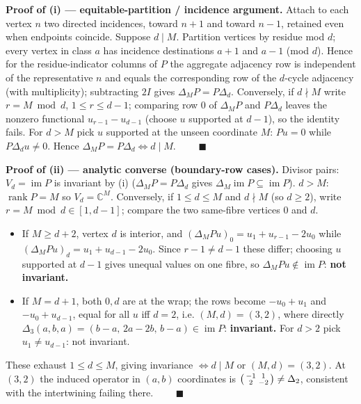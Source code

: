 \documentclass[
  11pt,
  a4paper,
]{article}
\providecommand{\tightlist}{%
  \setlength{\itemsep}{0pt}\setlength{\parskip}{0pt}}
\begin{document}
\textbf{Proof of (i) --- equitable-partition / incidence argument.} Attach to each vertex \(n\) two directed incidences, toward \(n{+}1\) and toward \(n{-}1\), retained even when endpoints coincide. Suppose \(d\mid M\). Partition vertices by residue mod \(d\); every vertex in class \(a\) has incidence destinations \(a{+}1\) and \(a{-}1\) (mod \(d\)). Hence for the residue-indicator columns of \(P\) the aggregate adjacency row is independent of the representative \(n\) and equals the corresponding row of the \(d\)-cycle adjacency (with multiplicity); subtracting \(2I\) gives \(\Delta_M P=P\Delta_d\). Conversely, if \(d\nmid M\) write \(r=M\bmod d\), \(1\le r\le d-1\); comparing row \(0\) of \(\Delta_M P\) and \(P\Delta_d\) leaves the nonzero functional \(u_{r-1}-u_{d-1}\) (choose \(u\) supported at \(d-1\)), so the identity fails. For \(d>M\) pick \(u\) supported at the unseen coordinate \(M\): \(Pu=0\) while \(P\Delta_d u\neq0\). Hence \(\Delta_M P=P\Delta_d\iff d\mid M\). \(\qquad\blacksquare\)

\textbf{Proof of (ii) --- analytic converse (boundary-row cases).} Divisor pairs: \(V_d=\operatorname{im}P\) is invariant by (i) (\(\Delta_M P=P\Delta_d\) gives \(\Delta_M\operatorname{im}P\subseteq\operatorname{im}P\)). \(d>M\): \(\operatorname{rank}P=M\) so \(V_d=\mathbb C^M\). Conversely, if \(1\le d\le M\) and \(d\nmid M\) (so \(d\ge2\)), write \(r=M\bmod d\in[1,d-1]\); compare the two same-fibre vertices \(0\) and \(d\).

\begin{itemize}
\tightlist
\item
  If \(M\ge d+2\), vertex \(d\) is interior, and \((\Delta_M Pu)_0=u_1+u_{r-1}-2u_0\) while \((\Delta_M Pu)_d=u_1+u_{d-1}-2u_0\). Since \(r-1\neq d-1\) these differ; choosing \(u\) supported at \(d-1\) gives unequal values on one fibre, so \(\Delta_M Pu\notin\operatorname{im}P\): \textbf{not invariant.}
\item
  If \(M=d+1\), both \(0,d\) are at the wrap; the rows become \(-u_0+u_1\) and \(-u_0+u_{d-1}\), equal for all \(u\) iff \(d=2\), i.e. \((M,d)=(3,2)\), where directly \(\Delta_3(a,b,a)=(b{-}a,\,2a{-}2b,\,b{-}a)\in\operatorname{im}P\): \textbf{invariant.} For \(d>2\) pick \(u_1\neq u_{d-1}\): not invariant.
\end{itemize}

These exhaust \(1\le d\le M\), giving invariance \(\iff d\mid M\) or \((M,d)=(3,2)\). At \((3,2)\) the induced operator in \((a,b)\) coordinates is \(\begin{psmallmatrix}-1&1\\2&-2\end{psmallmatrix}\neq\Delta_2\), consistent with the intertwining failing there. \(\qquad\blacksquare\)
\end{document}
